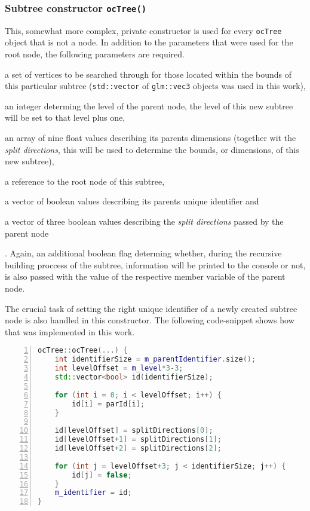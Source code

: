 \subsubsection{Subtree constructor \texttt{ocTree()}}
	This, somewhat more complex, private constructor is used for every \texttt{ocTree} object that is not a node. In addition to the parameters that were used for the root node, the following parameters are required.
	\begin{enumerate*}
		\item a set of vertices to be searched through for those located within the bounds of this particular subtree (\texttt{std::vector} of \texttt{glm::vec3} objects was used in this work), 
		\item an integer determing the level of the parent node, the level of this new subtree will be set to that level plus one,
		\item an array of nine float values describing its parents dimensions (together wit the \textit{split directions}, this will be used to determine the bounds, or dimensions, of this new subtree),
		\item a reference to the root node of this subtree,
		\item a vector of boolean values describing its parents unique identifier and
		\item a vector of three boolean values describing the \textit{split directions} passed by the parent node
	\end{enumerate*}.
	Again, an additional boolean flag determing whether, during the recursive building proccess of the subtree, information will be printed to the console or not, is also passed with the value of the respective member variable of the parent node.

The crucial task of setting the right unique identifier of a newly created subtree node is also handled in this constructor. The following code-snippet shows how that was implemented in this work.

\begin{minipage}{\linewidth}
\begin{lstlisting}[language=C++,numberstyle=\zebra{black!5}{white}{},numbers=left,xleftmargin=2em,tabsize=3]
ocTree::ocTree(...) {
	int identifierSize = m_parentIdentifier.size();
	int levelOffset = m_level*3-3;
	std::vector<bool> id(identifierSize);

	for (int i = 0; i < levelOffset; i++) {
		id[i] = parId[i];
	}

	id[levelOffset] = splitDirections[0];
	id[levelOffset+1] = splitDirections[1];
	id[levelOffset+2] = splitDirections[2];

	for (int j = levelOffset+3; j < identifierSize; j++) {
		id[j] = false;
	}
	m_identifier = id;
}
\end{lstlisting}
\end{minipage}

